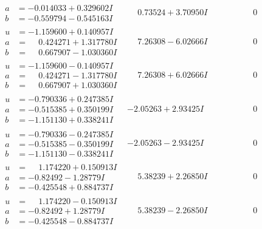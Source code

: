 \documentclass[1p]{elsarticle_modified}
\theoremstyle{definition}
\begin{document}
$$\begin{array}{c|c|c}
\begin{aligned}
a &= -0.014033 + 0.329602 I \\
b &= -0.559794 - 0.545163 I\end{aligned}
 & \phantom{-}0.73524 + 3.70950 I & \phantom{-0.000000 } 0 \\ \hline\begin{aligned}
u &= -1.159600 + 0.140957 I \\
a &= \phantom{-}0.424271 + 1.317780 I \\
b &= \phantom{-}0.667907 - 1.030360 I\end{aligned}
 & \phantom{-}7.26308 - 6.02666 I & \phantom{-0.000000 } 0 \\ \hline\begin{aligned}
u &= -1.159600 - 0.140957 I \\
a &= \phantom{-}0.424271 - 1.317780 I \\
b &= \phantom{-}0.667907 + 1.030360 I\end{aligned}
 & \phantom{-}7.26308 + 6.02666 I & \phantom{-0.000000 } 0 \\ \hline\begin{aligned}
u &= -0.790336 + 0.247385 I \\
a &= -0.515385 + 0.350199 I \\
b &= -1.151130 + 0.338241 I\end{aligned}
 & -2.05263 + 2.93425 I & \phantom{-0.000000 } 0 \\ \hline\begin{aligned}
u &= -0.790336 - 0.247385 I \\
a &= -0.515385 - 0.350199 I \\
b &= -1.151130 - 0.338241 I\end{aligned}
 & -2.05263 - 2.93425 I & \phantom{-0.000000 } 0 \\ \hline\begin{aligned}
u &= \phantom{-}1.174220 + 0.150913 I \\
a &= -0.82492 - 1.28779 I \\
b &= -0.425548 + 0.884737 I\end{aligned}
 & \phantom{-}5.38239 + 2.26850 I & \phantom{-0.000000 } 0 \\ \hline\begin{aligned}
u &= \phantom{-}1.174220 - 0.150913 I \\
a &= -0.82492 + 1.28779 I \\
b &= -0.425548 - 0.884737 I\end{aligned}
 & \phantom{-}5.38239 - 2.26850 I & \phantom{-0.000000 } 0\\

\end{array}$$
\end{document}
